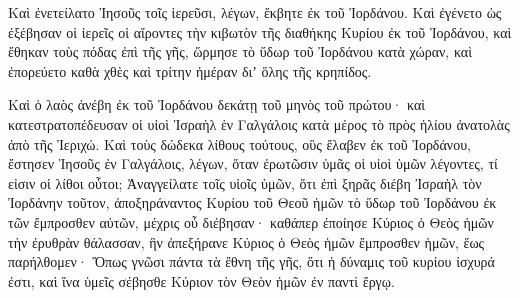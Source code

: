 {Καὶ ἐνετείλατο Ἰησοῦς τοῖς ἱερεῦσι, λέγων, ἔκβητε ἐκ τοῦ Ἰορδάνου.
Καὶ ἐγένετο ὡς ἐξέβησαν οἱ ἱερεῖς οἱ αἴροντες τὴν κιβωτὸν τῆς διαθήκης Κυρίου ἐκ τοῦ Ἰορδάνου, καὶ ἔθηκαν τοὺς πόδας ἐπὶ τῆς γῆς, ὥρμησε τὸ ὕδωρ τοῦ Ἰορδάνου κατὰ χώραν, καὶ ἐπορεύετο καθὰ χθὲς καὶ τρίτην ἡμέραν διʼ ὅλης τῆς κρηπίδος.
\par }{\PP {}Καὶ ὁ λαὸς ἀνέβη ἐκ τοῦ Ἰορδάνου δεκάτῃ τοῦ μηνὸς τοῦ πρώτου· καὶ κατεστρατοπέδευσαν οἱ υἱοὶ Ἰσραὴλ ἑν Γαλγάλοις κατὰ μέρος τὸ πρὸς ἡλίου ἀνατολὰς ἀπὸ τῆς Ἱεριχώ.
Καὶ τοὺς δώδεκα λίθους τούτους, οὓς ἔλαβεν ἐκ τοῦ Ἰορδάνου, ἔστησεν Ἰησοῦς ἐν Γαλγάλοις,
λέγων, ὅταν ἐρωτῶσιν ὑμᾶς οἱ υἱοὶ ὑμῶν λέγοντες, τί εἰσιν οἱ λίθοι οὗτοι;
Ἀναγγείλατε τοῖς υἱοῖς ὑμῶν, ὅτι ἐπὶ ξηρᾶς διέβη Ἰσραὴλ τὸν Ἰορδάνην τοῦτον,
ἀποξηράναντος Κυρίου τοῦ Θεοῦ ἡμῶν τὸ ὕδωρ τοῦ Ἰορδάνου ἐκ τῶν ἔμπροσθεν αὐτῶν, μέχρις οὗ διέβησαν· καθάπερ ἐποίησε Κύριος ὁ Θεὸς ἡμῶν τὴν ἐρυθρὰν θάλασσαν, ἣν ἀπεξήρανε Κύριος ὁ Θεὸς ἡμῶν ἔμπροσθεν ἡμῶν, ἕως παρήλθομεν·
Ὅπως γνῶσι πάντα τὰ ἔθνη τῆς γῆς, ὅτι ἡ δύναμις τοῦ κυρίου ἰσχυρά ἐστι, καὶ ἵνα ὑμεῖς σέβησθε Κύριον τὸν Θεὸν ἡμῶν ἐν παντὶ ἔργῳ.

}
